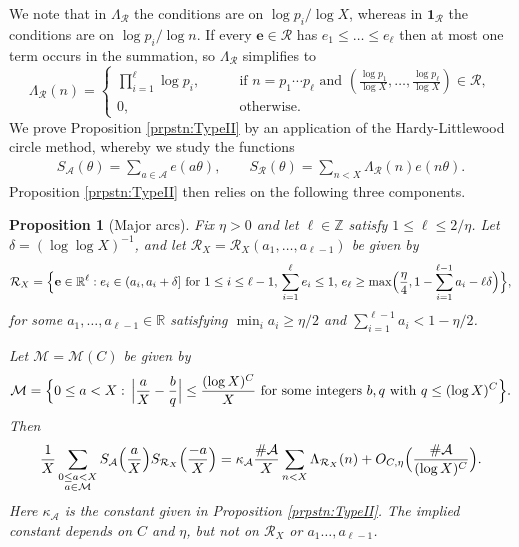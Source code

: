 \documentclass[10pt]{amsart}
\theoremstyle{plain}
\newtheorem{prpstn}[thrm]{Proposition}
\numberwithin{sblmm}{thrm}
\numberwithin{equation}{section}
\begin{document}
We note that in $\Lambda_\mathcal{R}$ the conditions are on $\log{p_i}/\log{X}$, whereas in $\mathbf{1}_{\mathcal{R}}$ the conditions are on $\log{p_i}/\log{n}$. If every $\mathbf{e}\in\mathcal{R}$ has $e_1\le \dots \le e_\ell$ then at most one term occurs in the summation, so $\Lambda_{\mathcal{R}}$ simplifies to
\[
\Lambda_{\mathcal{R}}(n)=\begin{cases}
\prod_{i=1}^{\ell}\log{p_i},\qquad &\text{if }n=p_1\cdots p_\ell\text{ and }(\frac{\log{p}_1}{\log{X}},\dots,\frac{\log{p_\ell}}{\log{X}})\in\mathcal{R},\\
0,&\text{otherwise.}
\end{cases}
\]
%
%
We prove Proposition \ref{prpstn:TypeII} by an application of the Hardy-Littlewood circle method, whereby we study the functions
%
\begin{align*}
S_{\mathcal{A}}(\theta)=\sum_{a\in\mathcal{A} }e(a\theta),\qquad S_{\mathcal{R}}(\theta)=\sum_{n<X}\Lambda_{\mathcal{R}}(n)e(n\theta).
\end{align*}
%
Proposition \ref{prpstn:TypeII} then relies on the following three components.
%
%
%
%
\begin{prpstn}[Major arcs] \label{prpstn:Major}
%
Fix $\eta>0$ and let $\ell\in\mathbb{Z}$ satisfy $1\le \ell \le 2/\eta$. Let $\delta=(\log\log{X})^{-1}$, and let $\mathcal{R}_X=\mathcal{R}_X(a_1,\dots,a_{\ell-1})$ be given by
\[
\mathcal{R}_X=\Bigl\{\mathbf{e}\in\mathbb{R}^\ell: e_i\in (a_i,a_i+\delta]\text{ for }1\le i\le\ell-1,\, \sum_{i=1}^\ell e_i\le 1,\,e_\ell\ge \max\Bigl(\frac{\eta}{4},1-\sum_{i=1}^{\ell-1}a_i-\ell\delta\Bigr)\Bigr\},
\]
for some $a_1,\dots,a_{\ell-1}\in\mathbb{R}$ satisfying $\min_i a_i\ge \eta/2$ and $\sum_{i=1}^{\ell-1}a_i<1-\eta/2$.

Let $\mathcal{M}=\mathcal{M}(C)$ be given by
\[
\mathcal{M}=\Bigl\{0\le a<X:\, \Bigl|\frac{a}{X}-\frac{b}{q}\Bigr|\le \frac{(\log{X})^C}{X}\text{ for some integers $b,q$ with }q\le (\log{X})^C\Bigr\}.
\]
Then
\[
\frac{1}{X}\sum_{\substack{0\le a<X\\ a\in\mathcal{M}}}S_{\mathcal{A}}\Bigl(\frac{a}{X}\Bigr)S_{\mathcal{R}_X}\Bigl(\frac{-a}{X}\Bigr)=\kappa_\mathcal{A}\frac{\#\mathcal{A}}{X}\sum_{n< X}\Lambda_{\mathcal{R}_X}(n)+O_{C,\eta}\Bigl(\frac{\#\mathcal{A}}{(\log{X})^C}\Bigr).
\]
Here $\kappa_\mathcal{A}$ is the constant given in Proposition \ref{prpstn:TypeII}. The implied constant depends on $C$ and $\eta$, but not on $\mathcal{R}_X$ or $a_1\dots,a_{\ell-1}$.
%
\end{prpstn}
\end{document}
